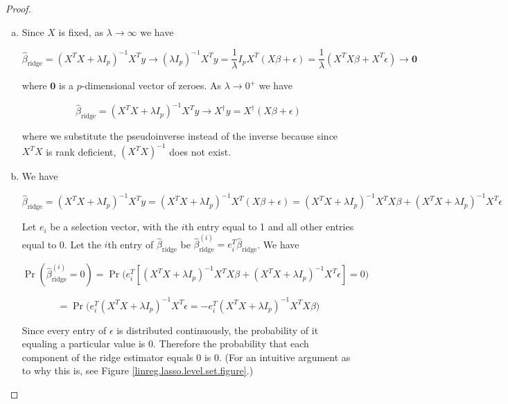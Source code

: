\begin{proof}


\begin{enumerate}[(a)]

\item Since \(X\) is fixed, as \(\lambda \to \infty\) we have

\[
\hat{\beta}_{\text{ridge}} = (X^TX + \lambda I_p)^{-1}X^Ty \to (\lambda I_p)^{-1} X^Ty = \frac{1}{\lambda} I_p X^T(X \beta + \epsilon) = \frac{1}{\lambda} (X^TX \beta + X^T\epsilon)  \to \boldsymbol{0}
\]

where \(\boldsymbol{0}\) is a \(p\)-dimensional vector of zeroes. As \(\lambda \to 0^{+}\) we have

\[
\hat{\beta}_{\text{ridge}} = (X^TX + \lambda I_p)^{-1}X^Ty \to X^{\dagger}y = X^{\dagger}(X \beta + \epsilon)
\]


where we substitute the pseudoinverse instead of the inverse because since \(X^TX\) is rank deficient, \((X^TX)^{-1}\) does not exist. 


\item We have 

\[
\hat{\beta}_{\text{ridge}} = (X^TX + \lambda I_p)^{-1}X^Ty = (X^TX + \lambda I_p)^{-1}X^T(X \beta + \epsilon) = (X^TX + \lambda I_p)^{-1}X^TX \beta + (X^TX + \lambda I_p)^{-1}X^T  \epsilon
\]

Let \(e_i\) be a selection vector, with the \(i\)th entry equal to 1 and all other entries equal to 0. Let the \(i\)th entry of \(\hat{\beta}_{\text{ridge}} \) be \(\hat{\beta}_{\text{ridge}}^{(i)} = e_i^T \hat{\beta}_{\text{ridge}}  \). We have

\[
\Pr(\hat{\beta}_{\text{ridge}}^{(i)}  = 0) = \Pr \big( e_i^T  [(X^TX + \lambda I_p)^{-1}X^TX \beta + (X^TX + \lambda I_p)^{-1}X^T  \epsilon] = 0 \big)
\]

\[
= \Pr \big( e_i^T (X^TX + \lambda I_p)^{-1}X^T  \epsilon = -e_i^T  (X^TX + \lambda I_p)^{-1}X^TX \beta \big)
\]

Since every entry of \(\epsilon\) is distributed continuously, the probability of it equaling a particular value is 0. Therefore the probability that each component of the ridge estimator equals 0 is 0. (For an intuitive argument as to why this is, see Figure \ref{linreg.lasso.level.set.figure}.)

\end{enumerate}

\end{proof}

